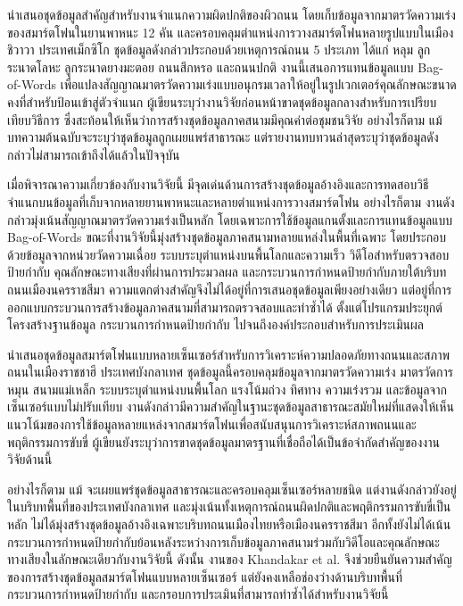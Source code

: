 \textcite{gonzalez2017} นำเสนอชุดข้อมูลสำคัญสำหรับงานจำแนกความผิดปกติของผิวถนน โดยเก็บข้อมูลจากมาตรวัดความเร่งของสมาร์ตโฟนในยานพาหนะ 12 คัน และครอบคลุมตำแหน่งการวางสมาร์ตโฟนหลายรูปแบบในเมืองชิวาวา ประเทศเม็กซิโก ชุดข้อมูลดังกล่าวประกอบด้วยเหตุการณ์ถนน 5 ประเภท ได้แก่ หลุม ลูกระนาดโลหะ ลูกระนาดยางมะตอย ถนนสึกหรอ และถนนปกติ งานนี้เสนอการแทนข้อมูลแบบ Bag-of-Words เพื่อแปลงสัญญาณมาตรวัดความเร่งแบบอนุกรมเวลาให้อยู่ในรูปเวกเตอร์คุณลักษณะขนาดคงที่สำหรับป้อนเข้าสู่ตัวจำแนก ผู้เขียนระบุว่างานวิจัยก่อนหน้าขาดชุดข้อมูลกลางสำหรับการเปรียบเทียบวิธีการ ซึ่งสะท้อนให้เห็นว่าการสร้างชุดข้อมูลภาคสนามมีคุณค่าต่อชุมชนวิจัย อย่างไรก็ตาม แม้บทความต้นฉบับจะระบุว่าชุดข้อมูลถูกเผยแพร่สาธารณะ แต่รายงานทบทวนล่าสุดระบุว่าชุดข้อมูลดังกล่าวไม่สามารถเข้าถึงได้แล้วในปัจจุบัน

เมื่อพิจารณาความเกี่ยวข้องกับงานวิจัยนี้ \textcite{gonzalez2017} มีจุดเด่นด้านการสร้างชุดข้อมูลอ้างอิงและการทดสอบวิธีจำแนกบนข้อมูลที่เก็บจากหลายยานพาหนะและหลายตำแหน่งการวางสมาร์ตโฟน อย่างไรก็ตาม งานดังกล่าวมุ่งเน้นสัญญาณมาตรวัดความเร่งเป็นหลัก โดยเฉพาะการใช้ข้อมูลแกนตั้งและการแทนข้อมูลแบบ Bag-of-Words ขณะที่งานวิจัยนี้มุ่งสร้างชุดข้อมูลภาคสนามหลายแหล่งในพื้นที่เฉพาะ โดยประกอบด้วยข้อมูลจากหน่วยวัดความเฉื่อย ระบบระบุตำแหน่งบนพื้นโลกและความเร็ว วิดีโอสำหรับตรวจสอบป้ายกำกับ คุณลักษณะทางเสียงที่ผ่านการประมวลผล และกระบวนการกำหนดป้ายกำกับภายใต้บริบทถนนเมืองนครราชสีมา ความแตกต่างสำคัญจึงไม่ได้อยู่ที่การเสนอชุดข้อมูลเพียงอย่างเดียว แต่อยู่ที่การออกแบบกระบวนการสร้างข้อมูลภาคสนามที่สามารถตรวจสอบและทำซ้ำได้ ตั้งแต่โปรแกรมประยุกต์ โครงสร้างฐานข้อมูล กระบวนการกำหนดป้ายกำกับ ไปจนถึงองค์ประกอบสำหรับการประเมินผล

\textcite{khandakar2025} นำเสนอชุดข้อมูลสมาร์ตโฟนแบบหลายเซ็นเซอร์สำหรับการวิเคราะห์ความปลอดภัยทางถนนและสภาพถนนในเมืองราชชาฮี ประเทศบังกลาเทศ ชุดข้อมูลนี้ครอบคลุมข้อมูลจากมาตรวัดความเร่ง มาตรวัดการหมุน สนามแม่เหล็ก ระบบระบุตำแหน่งบนพื้นโลก แรงโน้มถ่วง ทิศทาง ความเร่งรวม และข้อมูลจากเซ็นเซอร์แบบไม่ปรับเทียบ งานดังกล่าวมีความสำคัญในฐานะชุดข้อมูลสาธารณะสมัยใหม่ที่แสดงให้เห็นแนวโน้มของการใช้ข้อมูลหลายแหล่งจากสมาร์ตโฟนเพื่อสนับสนุนการวิเคราะห์สภาพถนนและพฤติกรรมการขับขี่ ผู้เขียนยังระบุว่าการขาดชุดข้อมูลมาตรฐานที่เชื่อถือได้เป็นข้อจำกัดสำคัญของงานวิจัยด้านนี้

อย่างไรก็ตาม แม้ \textcite{khandakar2025} จะเผยแพร่ชุดข้อมูลสาธารณะและครอบคลุมเซ็นเซอร์หลายชนิด แต่งานดังกล่าวยังอยู่ในบริบทพื้นที่ของประเทศบังกลาเทศ และมุ่งเน้นทั้งเหตุการณ์ถนนผิดปกติและพฤติกรรมการขับขี่เป็นหลัก ไม่ได้มุ่งสร้างชุดข้อมูลอ้างอิงเฉพาะบริบทถนนเมืองไทยหรือเมืองนครราชสีมา อีกทั้งยังไม่ได้เน้นกระบวนการกำหนดป้ายกำกับย้อนหลังระหว่างการเก็บข้อมูลภาคสนามร่วมกับวิดีโอและคุณลักษณะทางเสียงในลักษณะเดียวกับงานวิจัยนี้ ดังนั้น งานของ Khandakar et al. จึงช่วยยืนยันความสำคัญของการสร้างชุดข้อมูลสมาร์ตโฟนแบบหลายเซ็นเซอร์ แต่ยังคงเหลือช่องว่างด้านบริบทพื้นที่ กระบวนการกำหนดป้ายกำกับ และกรอบการประเมินที่สามารถทำซ้ำได้สำหรับงานวิจัยนี้

